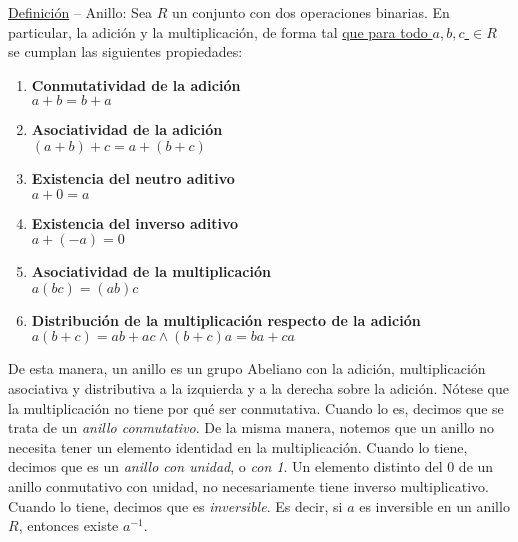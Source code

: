 \documentclass[../main.tex]{subfiles}
\begin{document}
{{        \newpage
        \ul{Definición} -- Anillo: Sea $R$ un conjunto con dos operaciones binarias. En particular, la adición y la multiplicación, de forma tal \ul{que para todo $a,b,c$ $\in R$} se cumplan las siguientes propiedades:
        \begin{enumerate}
            \item \textbf{Conmutatividad de la adición}                          \\ $a+b = b+a$
            \item \textbf{Asociatividad de la adición}                           \\ $(a+b)+c = a+(b+c)$
            \item \textbf{Existencia del neutro aditivo}                         \\ $a+0 = a$
            \item \textbf{Existencia del inverso aditivo}                        \\ $a + (-a) = 0$
            \item \textbf{Asociatividad de la multiplicación}                    \\ $a(bc) = (ab)c$
            \item \textbf{Distribución de la multiplicación respecto de la adición} \\ $a(b+c) = ab +ac \land (b+c)a = ba+ca$
        \end{enumerate}
        
        
        De esta manera, un anillo es un grupo Abeliano con la adición, multiplicación asociativa y distributiva a la izquierda y a la derecha sobre la adición. Nótese que la multiplicación no tiene por qué ser conmutativa. Cuando lo es, decimos que se trata de un \textit{anillo conmutativo}. De la misma manera, notemos que un anillo no necesita tener un elemento identidad en la multiplicación. Cuando lo tiene, decimos que es un \textit{anillo con unidad}, o \textit{con 1}. Un elemento distinto del 0 de un anillo conmutativo con unidad, no necesariamente tiene inverso multiplicativo. Cuando lo tiene, decimos que es \textit{inversible}. Es decir, si $a$ es inversible en un anillo $R$, entonces existe $a^{-1}$.
    }
}
\end{document}
